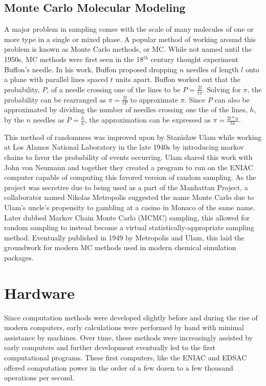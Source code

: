 \subsection{Monte Carlo Molecular Modeling}

A major problem in sampling comes with the scale of many molecules of one or more type in a single or mixed phase.
A popular method of working around this problem is known as Monte Carlo methods, or MC.
While not named until the 1950s, MC methods were first seen in the 18$^{th}$ century thought experiment Buffon's needle.\cite{buffon}
In his work, Buffon proposed dropping $n$ needles of length $l$ onto a plane with parallel lines spaced $t$ units apart.
Buffon worked out that the probability, $P$, of a needle crossing one of the lines to be $P=\frac{2l}{t\pi}$.
Solving for $\pi$, the probability can be rearranged as $\pi=\frac{2l}{tP}$ to approximate $\pi$.
Since $P$ can also be approximated by dividing the number of needles crossing one the of the lines, $h$, by the $n$ needles as $P=\frac{h}{n}$, the approximation can be expressed as $\pi=\frac{2l*n}{th}$.

This method of randomness was improved upon by Stanislaw Ulam while working at Los Alamos National Laboratory in the late 1940s by introducing markov chains to favor the probability of events occurring.
Ulam shared this work with John von Neumann and together they created a program to run on the ENIAC computer capable of computing this favored version of random sampling.
As the project was secretive due to being used as a part of the Manhattan Project, a collaborator named Nikolas Metropolis suggested the name Monte Carlo due to Ulam's uncle's propensity to gambling at a casino in Monaco of the same name.\cite{MCOrigins}
Later dubbed Markov Chain Monte Carlo (MCMC) sampling, this allowed for random sampling to instead become a virtual statistically-appropriate sampling method.
Eventually published in 1949 by Metropolis and Ulam, this laid the groundwork for modern MC methods used in modern chemical simulation packages. 


\section{Hardware}

Since computation methods were developed slightly before and during the rise of modern computers, early calculations were performed by hand with minimal assistance by machines. 
Over time, these methods were increasingly assisted by early computers and further development eventually led to the first computational programs.
These first computers, like the ENIAC and EDSAC offered computation power in the order of a few dozen to a few thousand operations per second.

